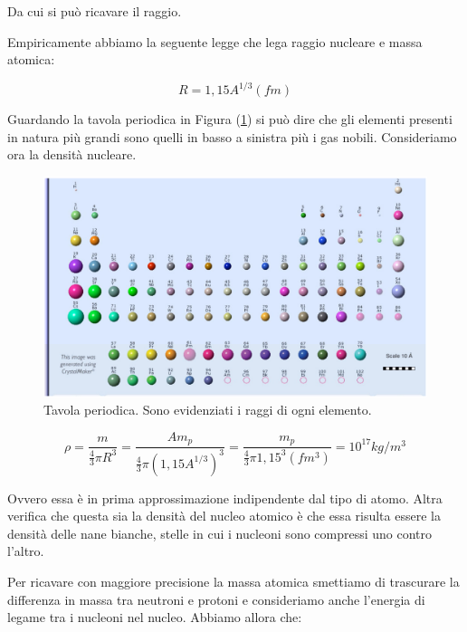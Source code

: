 Da cui si può ricavare il raggio.

Empiricamente abbiamo la seguente legge che lega raggio nucleare e massa atomica:

\begin{equation}
R=1,15A^{1/3} (fm)
\end{equation}

Guardando la tavola periodica in Figura (\ref{atomicradii}) si può dire che gli elementi presenti in natura più grandi sono quelli in basso a sinistra più i gas nobili.
Consideriamo ora la densità nucleare. 

\begin{figure}
\centering
		\includegraphics[width=16cm, keepaspectratio]{figs/atomicradii.png}
		\caption{Tavola periodica. Sono evidenziati i raggi di ogni elemento.}
         \label{atomicradii}
\end{figure}

\begin{equation}
\rho=\frac{m}{\frac{4}{3}\pi R^3}=\frac{Am_p}{\frac{4}{3}\pi (1,15 A^{1/3})^3}=\frac{m_p}{\frac{4}{3}\pi 1,15^3 (fm^3)} = 10^{17} kg/m^3
\end{equation}

Ovvero essa è in prima approssimazione indipendente dal tipo di atomo. 
Altra verifica che questa sia la densità del nucleo atomico è che essa risulta essere la densità delle nane bianche, stelle in cui i nucleoni sono compressi uno contro l'altro.
                                                                                                                    
Per ricavare con maggiore precisione la massa atomica smettiamo di trascurare la differenza in massa tra neutroni e protoni e consideriamo anche l'energia di legame tra i nucleoni nel nucleo. Abbiamo allora che:

